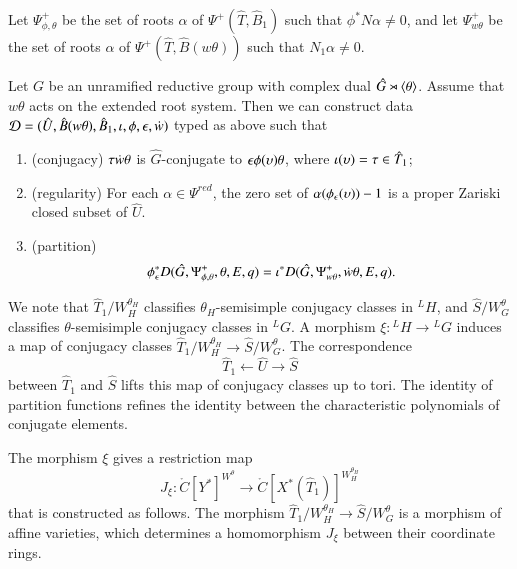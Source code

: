 Let $\Psi_{\phi,\theta}^+$ be the set of roots $\alpha$ of
  $\Psi^+(\hat T,\hat B_1)$ such that $\phi^*N\alpha\ne 0$, and let
  $\Psi_{w\theta}^+$ 
be the set of roots $\alpha$ of $\Psi^+(\hat T,\hat B(w\theta))$ such
  that $N_1\alpha\ne0$.  

\begin{proposition}\label{lemma:ephi}
  Let $G$ be an unramified reductive group with complex dual $\hat
  G\rtimes \langle{\theta}\rangle$.  Assume that $w\theta$ acts on the extended
  root system.  Then we can construct data $\mathcal D=(\hat U,\hat
  B(w\theta),\hat B_1,\iota,\phi,\epsilon,\dot w)$ typed as above such
  that
\begin{enumerate}
\item (conjugacy) $\tau\dot w\theta$ is $\hat G$-conjugate to
  $\epsilon\phi(\upsilon) \theta$, where $\iota(\upsilon) = \tau\in\hat T_1$;
\item (regularity) For each $\alpha\in\Psi^{red}$, the zero set of
  $\alpha(\phi_\epsilon(\upsilon))-1$ is a proper Zariski closed subset of
  $\hat U$.
\item (partition) 
\[
\phi^*_\epsilon D(\hat G,\Psi_{\phi,\theta}^+,\theta,E,q) =
\iota^* D(\hat G,\Psi_{w\theta}^+,\dot w\theta,E,q).
\]
\end{enumerate}
\end{proposition}

\begin{remark}
  We note that $\hat T_1/W_H^{\theta_H}$ classifies
  $\theta_H$-semisimple conjugacy classes in ${}^LH$, and $\hat
  S/W_G^{\theta}$ classifies $\theta$-semisimple conjugacy classes in
  ${}^LG$.  A morphism $\xi:{}^LH\to {}^LG$ induces a map of conjugacy
  classes $\hat T_1/W_H^{\theta_H}\to \hat S/W_G^\theta$.  The
  correspondence
\[
\hat T_1 \longleftarrow \hat U \longrightarrow \hat S
\]
between $\hat T_1$ and $\hat S$ lifts this map of conjugacy classes up
to tori.  The identity of partition functions refines the identity
between the characteristic polynomials of conjugate elements.

The morphism $\xi$ gives a restriction map
\begin{equation}\label{eqn:Jxi}
J_\xi:\ring{C}[Y^*]^{W^\theta} \to \ring{C}[X^*(\hat T_1)]^{W_H^{\theta_H}}
\end{equation}
that is constructed as follows.  The morphism $\hat
T_1/W_H^{\theta_H}\to \hat S/W_G^\theta$ is a morphism of affine
varieties, which determines a homomorphism $J_\xi$ between their
coordinate rings.
\end{remark}


